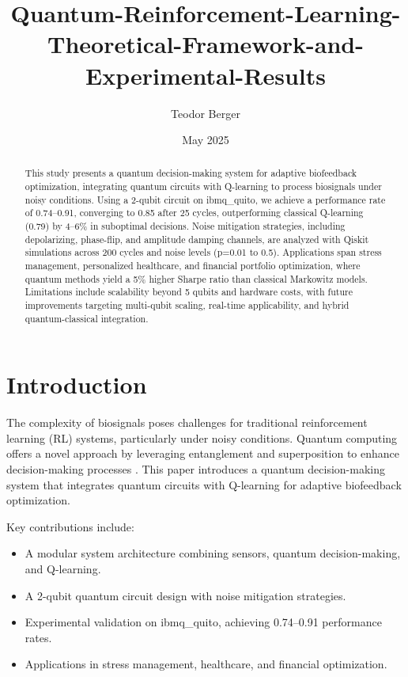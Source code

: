 \documentclass[12pt]{article}
\title{Quantum-Reinforcement-Learning-Theoretical-Framework-and-Experimental-Results}
\author{Teodor Berger}
\date{May 2025}
\begin{document}
\maketitle

\begin{abstract}
This study presents a quantum decision-making system for adaptive biofeedback optimization, integrating quantum circuits with Q-learning to process biosignals under noisy conditions. Using a 2-qubit circuit on ibmq\_quito, we achieve a performance rate of 0.74--0.91, converging to 0.85 after 25 cycles, outperforming classical Q-learning (0.79) by 4--6\% in suboptimal decisions. Noise mitigation strategies, including depolarizing, phase-flip, and amplitude damping channels, are analyzed with Qiskit simulations across 200 cycles and noise levels (p=0.01 to 0.5). Applications span stress management, personalized healthcare, and financial portfolio optimization, where quantum methods yield a 5\% higher Sharpe ratio than classical Markowitz models. Limitations include scalability beyond 5 qubits and hardware costs, with future improvements targeting multi-qubit scaling, real-time applicability, and hybrid quantum-classical integration.
\end{abstract}

\section{Introduction}
The complexity of biosignals poses challenges for traditional reinforcement learning (RL) systems, particularly under noisy conditions. Quantum computing offers a novel approach by leveraging entanglement and superposition to enhance decision-making processes \citep{orus2019quantum}. This paper introduces a quantum decision-making system that integrates quantum circuits with Q-learning for adaptive biofeedback optimization.

Key contributions include:
\begin{itemize}
    \item A modular system architecture combining sensors, quantum decision-making, and Q-learning.
    \item A 2-qubit quantum circuit design with noise mitigation strategies.
    \item Experimental validation on ibmq\_quito, achieving 0.74--0.91 performance rates.
    \item Applications in stress management, healthcare, and financial optimization.
\end{itemize}
\end{document}
